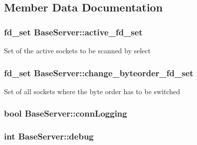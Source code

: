 \subsection{Member Data Documentation}
\hypertarget{classBaseServer_a9c66924719c4c28d5088dc6359dcf114}{
\subsubsection[{active\-\_\-fd\-\_\-set}]{\setlength{\rightskip}{0pt plus 5cm}fd\-\_\-set Base\-Server\-::active\-\_\-fd\-\_\-set\hspace{0.3cm}{\ttfamily [protected]}}}\label{classBaseServer_a9c66924719c4c28d5088dc6359dcf114}
Set of the active sockets to be scanned by select \hypertarget{classBaseServer_a3e5463a0e428bacd9a23d8f1e03ed943}{
\subsubsection[{change\-\_\-byteorder\-\_\-fd\-\_\-set}]{\setlength{\rightskip}{0pt plus 5cm}fd\-\_\-set Base\-Server\-::change\-\_\-byteorder\-\_\-fd\-\_\-set\hspace{0.3cm}{\ttfamily [protected]}}}\label{classBaseServer_a3e5463a0e428bacd9a23d8f1e03ed943}
Set of all sockets where the byte order has to be switched \hypertarget{classBaseServer_a59d77b9f67ebe2249d592360ba0ebee2}{
\subsubsection[{conn\-Logging}]{\setlength{\rightskip}{0pt plus 5cm}bool Base\-Server\-::conn\-Logging\hspace{0.3cm}{\ttfamily [protected]}}}\label{classBaseServer_a59d77b9f67ebe2249d592360ba0ebee2}
\hypertarget{classBaseServer_a078ea2911e24a247cfec950e13bb78dc}{
\subsubsection[{debug}]{\setlength{\rightskip}{0pt plus 5cm}int Base\-Server\-::debug\hspace{0.3cm}{\ttfamily [protected]}}}\label{classBaseServer_a078ea2911e24a247cfec950e13bb78dc}

